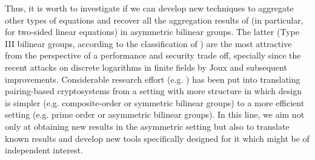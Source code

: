 Thus, it is worth to investigate if we can develop new techniques to aggregate 
other types of equations and recover all the aggregation results of \cite{C:JutRoy14} (in particular, for two-sided linear equations) in asymmetric bilinear groups. The latter (Type III bilinear groups, according to the classification of \cite{DAM:GalPatSma08}) are the most 
attractive 
from the perspective of a performance and security trade off, specially since the recent attacks on discrete logarithms in finite fields by Joux \cite{SAC:Joux13} and subsequent improvements. Considerable research effort 
(e.g. \cite{C:AGOT14a,EC:Freeman10})
has been put into translating pairing-based cryptosystems from a setting with more structure in which design is simpler (e.g. composite-order or symmetric bilinear groups) to a more efficient setting (e.g. prime order or asymmetric bilinear groups). In this line, we aim not only at obtaining new results in the asymmetric setting but also to translate known results and develop new tools specifically designed for it which might be of independent interest.


